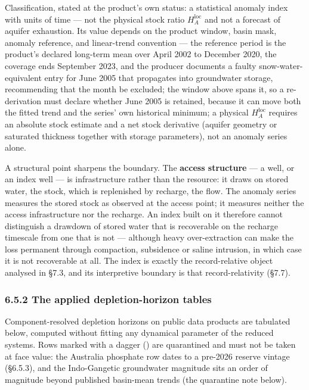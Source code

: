 \documentclass[11pt]{article}
\begin{document}
Classification, stated at the product's own status: a statistical anomaly index with units of time --- not the physical stock ratio \(H_A^{\mathrm{loc}}\) and not a forecast of aquifer exhaustion. Its value depends on the product window, basin mask, anomaly reference, and linear-trend convention --- the reference period is the product's declared long-term mean over April 2002 to December 2020, the coverage ends September 2023, and the producer documents a faulty snow-water-equivalent entry for June 2005 that propagates into groundwater storage, recommending that the month be excluded; the window above spans it, so a re-derivation must declare whether June 2005 is retained, because it can move both the fitted trend and the series' own historical minimum; a physical \(H_A^{\mathrm{loc}}\) requires an absolute stock estimate and a net stock derivative (aquifer geometry or saturated thickness together with storage parameters), not an anomaly series alone.

A structural point sharpens the boundary. The \textbf{access structure} --- a well, or an index well --- is infrastructure rather than the resource: it draws on stored water, the stock, which is replenished by recharge, the flow. The anomaly series measures the stored stock as observed at the access point; it measures neither the access infrastructure nor the recharge. An index built on it therefore cannot distinguish a drawdown of stored water that is recoverable on the recharge timescale from one that is not --- although heavy over-extraction can make the loss permanent through compaction, subsidence or saline intrusion, in which case it is not recoverable at all. The index is exactly the record-relative object analysed in \S7.3, and its interpretive boundary is that record-relativity (\S7.7).

\subsubsection*{6.5.2 The applied depletion-horizon tables}\label{652-the-applied-depletion-horizon-tables}

Component-resolved depletion horizons on public data products are tabulated below, computed without fitting any dynamical parameter of the reduced systems. Rows marked with a dagger (\dag{}) are quarantined and must not be taken at face value: the Australia phosphate row dates to a pre-2026 reserve vintage (\S6.5.3), and the Indo-Gangetic groundwater magnitude sits an order of magnitude beyond published basin-mean trends (the quarantine note below).
\end{document}
